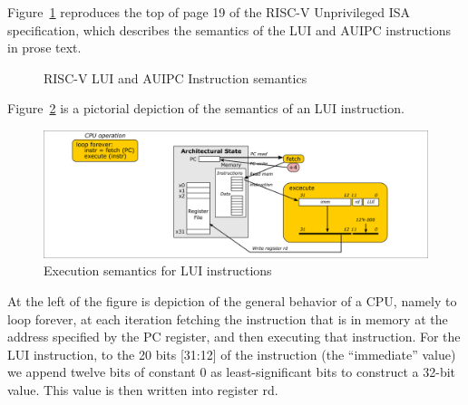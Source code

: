 Figure~\ref{Fig_LUI_AUIPC} reproduces the top of page 19 of the RISC-V
Unprivileged ISA specification, which describes the semantics of the
LUI and AUIPC instructions in prose text.
\begin{figure}[htbp]
  \centerline{}
  \caption{\label{Fig_LUI_AUIPC} RISC-V LUI and AUIPC Instruction semantics}
\end{figure}

Figure~\ref{Fig_LUI} is a pictorial depiction of the semantics of an LUI instruction.
\begin{figure}[htbp]
  \centerline{\includegraphics[width=6in,angle=0]{Figures/Fig_LUI}}
  \caption{\label{Fig_LUI} Execution semantics for LUI instructions}
\end{figure}
At the left of the figure is depiction of the general behavior of a
CPU, namely to loop forever, at each iteration fetching the
instruction that is in memory at the address specified by the PC
register, and then executing that instruction.  For the LUI
instruction, to the 20 bits [31:12] of the instruction (the
``immediate'' value) we append twelve bits of constant 0 as
least-significant bits to construct a 32-bit value.  This value is
then written into register rd.

